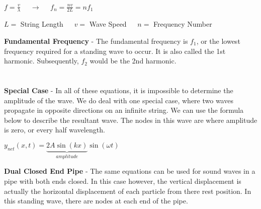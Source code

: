 \documentclass{article}
\begin{document}
\begin{center}
	$f=\frac{v}{\lambda} \:\:\:\:\:\:\longrightarrow \:\:\:\:\:\: f_n=\frac{nv}{2L}=nf_1$
	
	\vspace{\baselineskip}
	$L=$ String Length $\:\:\:\:$ $v=$ Wave Speed $\:\:\:\:$ $n=$ 
	Frequency Number 
\end{center}
\textbf{Fundamental Frequency} - The fundamental frequency is $f_1$, or the lowest frequency required for a standing wave to occur. It is also called the 1st harmonic. Subsequently, $f_2$ would be the 2nd harmonic.\\
\\
\\
\noindent\textbf{Special Case} - In all of these equations, it is impossible to determine the amplitude of the wave. We do deal with one special case, where two waves propagate in opposite directions on an infinite string. We can use the formula below to describe the resultant wave. The nodes in this wave are where amplitude is zero, or every half wavelength. \\
\begin{center}
	$y_{net}\left(x,t\right)=\underbrace{2A\sin\left(kx\right)}_{amplitude}\sin\left(\omega t\right)$
\end{center}
\vspace{\baselineskip}
\textbf{Dual Closed End Pipe} - The same equations can be used for sound waves in a pipe with both ends closed. In this case however, the vertical displacement is actually the horizontal displacement of each particle from there rest position. In this standing wave, there are nodes at each end of the pipe.
\begin{center}
	
	\hspace*{-8pt}	
\end{center}
\end{document}
